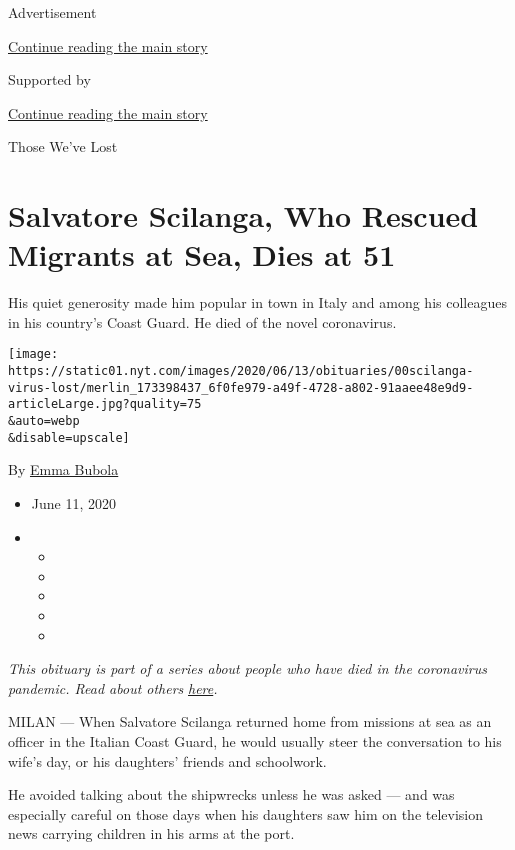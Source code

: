 Advertisement

\protect\hyperlink{after-top}{Continue reading the main story}

Supported by

\protect\hyperlink{after-sponsor}{Continue reading the main story}

Those We've Lost

\hypertarget{salvatore-scilanga-who-rescued-migrants-at-sea-dies-at-51}{%
\section{Salvatore Scilanga, Who Rescued Migrants at Sea, Dies at
51}\label{salvatore-scilanga-who-rescued-migrants-at-sea-dies-at-51}}

His quiet generosity made him popular in town in Italy and among his
colleagues in his country's Coast Guard. He died of the novel
coronavirus.

\texttt{[image: https://static01.nyt.com/images/2020/06/13/obituaries/00scilanga-virus-lost/merlin\_173398437\_6f0fe979-a49f-4728-a802-91aaee48e9d9-articleLarge.jpg?quality=75\\\&auto=webp\\\&disable=upscale]}

By \href{https://www.nytimes.com/by/emma-bubola}{Emma Bubola}

\begin{itemize}
\item
  June 11, 2020
\item
  \begin{itemize}
  \item
  \item
  \item
  \item
  \item
  \end{itemize}
\end{itemize}

\emph{This obituary is part of a series about people who have died in
the coronavirus pandemic. Read about others}
\href{https://www.nytimes.com/interactive/2020/obituaries/people-died-coronavirus-obituaries.html}{\emph{here}}\emph{.}

MILAN --- When Salvatore Scilanga returned home from missions at sea as
an officer in the Italian Coast Guard, he would usually steer the
conversation to his wife's day, or his daughters' friends and
schoolwork.

He avoided talking about the shipwrecks unless he was asked --- and was
especially careful on those days when his daughters saw him on the
television news carrying children in his arms at the port.

